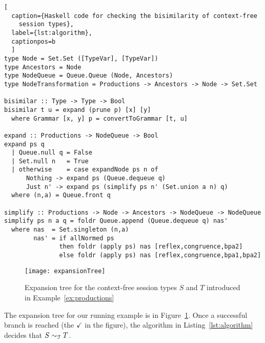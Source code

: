 \begin{lstlisting}[
  caption={Haskell code for checking the bisimilarity of context-free
    session types},
  label={lst:algorithm},
  captionpos=b
  ]
type Node = Set.Set ([TypeVar], [TypeVar])
type Ancestors = Node
type NodeQueue = Queue.Queue (Node, Ancestors)
type NodeTransformation = Productions -> Ancestors -> Node -> Set.Set

bisimilar :: Type -> Type -> Bool
bisimilar t u = expand (prune p) [x] [y]
  where Grammar [x, y] p = convertToGrammar [t, u]

expand :: Productions -> NodeQueue -> Bool
expand ps q
  | Queue.null q = False 
  | Set.null n   = True
  | otherwise    = case expandNode ps n of
      Nothing -> expand ps (Queue.dequeue q)
      Just n' -> expand ps (simplify ps n' (Set.union a n) q)
  where (n,a) = Queue.front q

simplify :: Productions -> Node -> Ancestors -> NodeQueue -> NodeQueue
simplify ps n a q = foldr Queue.append (Queue.dequeue q) nas'
  where nas  = Set.singleton (n,a)
        nas' = if allNormed ps
               then foldr (apply ps) nas [reflex,congruence,bpa2]
               else foldr (apply ps) nas [reflex,congruence,bpa1,bpa2]
\end{lstlisting}

\begin{figure}[h]
\centering
	\texttt{[image: expansionTree]}
	\caption{Expansion tree for the context-free session types $S$ and $T$
	introduced in Example~\ref{ex:productions}}
	\label{fig:expansionTree}
\end{figure}

\begin{example}
  The expansion tree for our running example is
  in Figure~\ref{fig:expansionTree}. Once a successful
  branch is reached (the $\checkmark$ in the figure), the algorithm in
  Listing~\ref{lst:algorithm} decides that $S\sim_\mathcal T T$.
\end{example}

